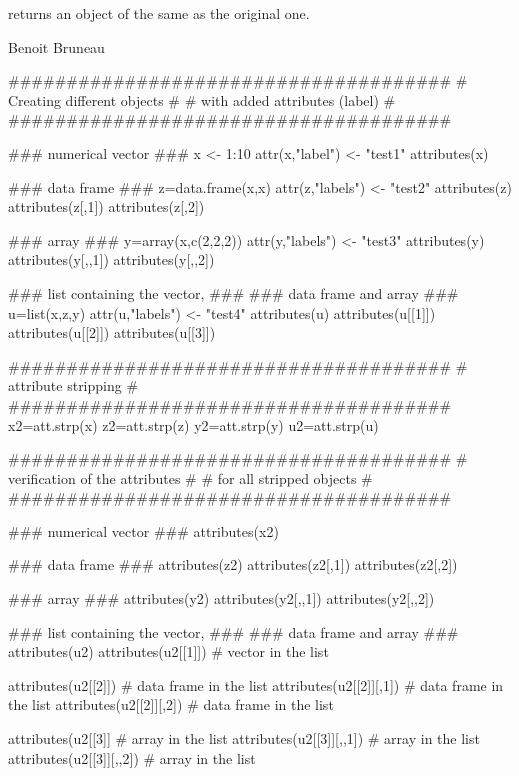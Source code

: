 \documentclass[a4paper]{book}
\begin{document}
%
\begin{Value}
returns an object of the same  as the original one.
\end{Value}
%
\begin{Author}\relax
Benoit Bruneau
\end{Author}
%
\begin{Examples}
\begin{ExampleCode}

######################################
#   Creating different objects       #
#    with added attributes (label)   #
######################################

### numerical vector ###
x <- 1:10
attr(x,"label") <- "test1"
attributes(x)

### data frame ###
z=data.frame(x,x)
attr(z,"labels") <- "test2"
attributes(z)
attributes(z[,1])
attributes(z[,2])

### array ###
y=array(x,c(2,2,2))
attr(y,"labels") <- "test3"
attributes(y)
attributes(y[,,1])
attributes(y[,,2])

### list containing the vector, ###
### data frame and array        ###
u=list(x,z,y)
attr(u,"labels") <- "test4"
attributes(u)
attributes(u[[1]])
attributes(u[[2]])
attributes(u[[3]])

######################################
#        attribute stripping         #
######################################
x2=att.strp(x)
z2=att.strp(z)
y2=att.strp(y)
u2=att.strp(u)

######################################
#   verification of the attributes   #
#    for all stripped objects        #
######################################

### numerical vector ###
attributes(x2)

### data frame ###
attributes(z2)
attributes(z2[,1])
attributes(z2[,2])

### array ###
attributes(y2)
attributes(y2[,,1])
attributes(y2[,,2])

### list containing the vector, ###
### data frame and array        ###
attributes(u2)
attributes(u2[[1]])       # vector in the list

attributes(u2[[2]])       # data frame in the list
attributes(u2[[2]][,1])   # data frame in the list
attributes(u2[[2]][,2])   # data frame in the list

attributes(u2[[3]]        # array in the list
attributes(u2[[3]][,,1])  # array in the list
attributes(u2[[3]][,,2])  # array in the list



\end{ExampleCode}
\end{Examples}
\end{document}
